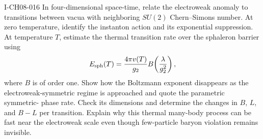 \begin{exercise}{I-CH08-016}
In four-dimensional space-time, relate the electroweak anomaly to transitions between vacua with neighboring
$SU(2)$ Chern--Simons number.  At zero temperature, identify the instanton
action and its exponential suppression.  At temperature $T$, estimate the
thermal transition rate over the sphaleron barrier using
\[
 E_{\rm sph}(T)=\frac{4\pi v(T)}{g_2}
 B\!\left(\frac{\lambda}{g_2^2}\right),
\]
where $B$ is of order one.  Show how the Boltzmann exponent disappears as the
electroweak-symmetric regime is approached and quote the parametric symmetric-
phase rate.  Check its dimensions and determine the changes in $B$, $L$, and
$B-L$ per transition.  Explain why this thermal many-body process can be fast
near the electroweak scale even though few-particle baryon violation remains
invisible.
\end{exercise}
